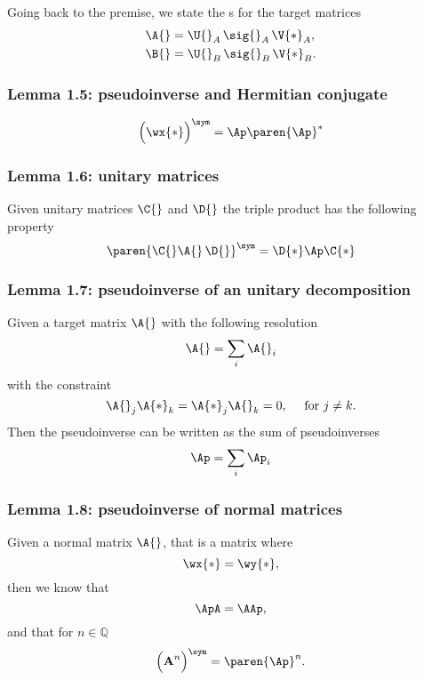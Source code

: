 Going back to the premise, we state the \asvd s for the target matrices
\begin{equation}
  \begin{split}
    \A{} &= \U{}_{A}\, \sig{}_{A}\, \V{*}_{A}, \\
    \B{} &= \U{}_{B}\, \sig{}_{B}\, \V{*}_{B}.
  \end{split}
\end{equation}


\subsubsection{Lemma 1.5: pseudoinverse and Hermitian conjugate}
\begin{equation}
  \Bigl(\wx{*}\Bigr)^{\sym} = \Ap \paren{\Ap}^{*} 
\end{equation}



\subsubsection{Lemma 1.6: unitary matrices}
Given unitary matrices $\C{}$ and $\D{}$ the triple product has the following property
\begin{equation}
  \paren{\C{} \A{}\, \D{}}^{\sym} = \D{*} \Ap \C{*}
\end{equation}


\subsubsection{Lemma 1.7: pseudoinverse of an unitary decomposition}
Given a target matrix $\A{}$ with the following resolution
\begin{equation}
  \A{} = \sum_{i} \A{}_{i} 
\end{equation}
with the constraint
\begin{equation}
  \A{}_{j}\A{*}_{k} = \A{*}_{j}\A{}_{k} = 0, \quad \text{ for } j\ne k.
\end{equation}
Then the pseudoinverse can be written as the sum of pseudoinverses
\begin{equation}
  \Ap = \sum_{i} \Ap_{i}
\end{equation}


\subsubsection{Lemma 1.8: pseudoinverse of normal matrices}
Given a normal matrix $\A{}$, that is a matrix where
\begin{equation}
  \wx{*} = \wy{*},
\end{equation}
then we know that
\begin{equation}
  \ApA = \AAp,
\end{equation}
and that for $n\in\mathbb{Q}$
\begin{equation}
  \Bigl(\textbf{A}^{n}\Bigr)^{\sym}  = \paren{\Ap}^{n}.
\end{equation}



